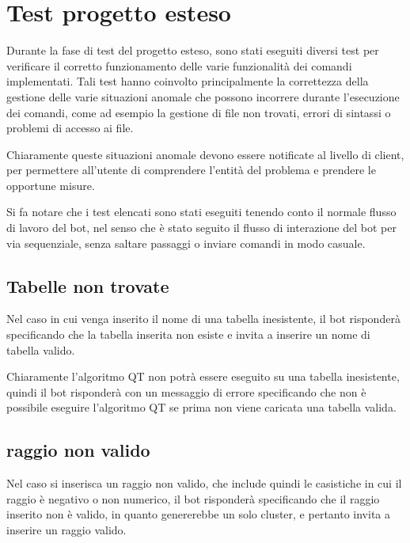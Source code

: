 \section{Test progetto esteso}

Durante la fase di test del progetto esteso, sono stati eseguiti diversi test per verificare il corretto funzionamento delle varie funzionalità dei comandi implementati. 
Tali test hanno coinvolto principalmente la correttezza della gestione delle varie situazioni anomale che possono incorrere durante l'esecuzione dei comandi, come ad esempio la gestione di file non trovati, errori di sintassi o problemi di accesso ai file.

Chiaramente queste situazioni anomale devono essere notificate al livello di client, per permettere all'utente di comprendere l'entità del problema e prendere le opportune misure.

Si fa notare che i test elencati sono stati eseguiti tenendo conto il normale flusso di lavoro del bot, nel senso che è stato seguito il flusso di interazione del bot per via sequenziale, senza saltare passaggi o inviare comandi in modo casuale.

\subsection{Tabelle non trovate}

Nel caso in cui venga inserito il nome di una tabella inesistente, il bot risponderà specificando che la tabella inserita non esiste e invita a inserire un nome di tabella valido.


Chiaramente l'algoritmo QT non potrà essere eseguito su una tabella inesistente, quindi il bot risponderà con un messaggio di errore specificando che non è possibile eseguire l'algoritmo QT se prima non viene caricata una tabella valida.


\subsection{raggio non valido}

Nel caso si inserisca un raggio non valido, che include quindi le casistiche in cui il raggio è negativo o non numerico, il bot risponderà specificando che il raggio inserito non è valido, in quanto genererebbe un solo cluster, e pertanto invita a inserire un raggio valido.

